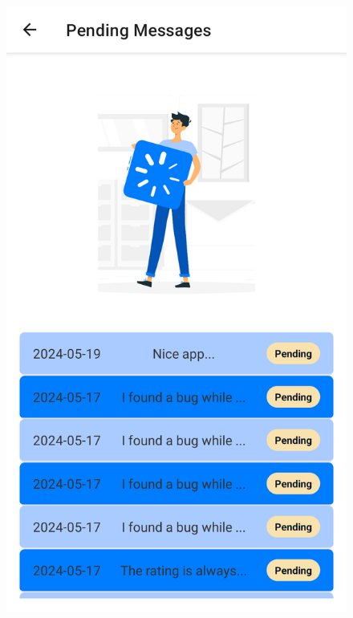 \begin{figure}[H]
\begin{minipage}{0.35\textwidth}
    \label{fig:login-form-filled}
\end{minipage}\hfill
\begin{minipage}{0.35\textwidth}
    \centering
    \includegraphics[width=\linewidth]{images/sprint4/feedBackModule (2).png}
    \label{fig:login-form}
\end{minipage}\hfill
\end{figure}
